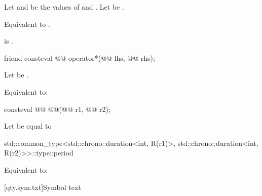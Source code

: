 \begin{itemdescr}
\pnum
Let  and  be the values of  and .
Let  be .

\pnum
\effects
Equivalent to
.

\pnum
\ensures
{} is .
\end{itemdescr}

\begin{itemdecl}
friend consteval @@ operator*(@@ lhs, @@ rhs);
\end{itemdecl}

\begin{itemdescr}
\pnum
Let  be .

\pnum
\effects
Equivalent to:
\end{itemdescr}

\begin{itemdecl}
consteval @@ @@(@@ r1, @@ r2);
\end{itemdecl}

\begin{itemdescr}
\pnum
Let  be equal to
\begin{codeblock}
std::common_type<std::chrono::duration<int, R(r1)>,
                 std::chrono::duration<int, R(r2)>>::type::period
\end{codeblock}

\pnum
\effects
Equivalent to:
\end{itemdescr}

[qty.sym.txt]{Symbol text}

